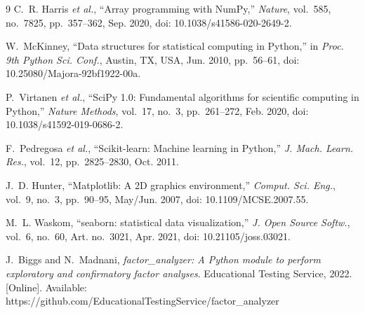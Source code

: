\documentclass[eng]{ajceam-class}
\begin{document}
\begin{thebibliography}{9}
C.~R. Harris \textit{et al.}, ``Array programming with NumPy,'' \textit{Nature}, vol.~585, no.~7825, pp.~357--362, Sep. 2020, doi: 10.1038/s41586-020-2649-2.

W.~McKinney, ``Data structures for statistical computing in Python,'' in \textit{Proc. 9th Python Sci. Conf.}, Austin, TX, USA, Jun. 2010, pp.~56--61, doi: 10.25080/Majora-92bf1922-00a.

P.~Virtanen \textit{et al.}, ``SciPy 1.0: Fundamental algorithms for scientific computing in Python,'' \textit{Nature Methods}, vol.~17, no.~3, pp.~261--272, Feb. 2020, doi: 10.1038/s41592-019-0686-2.

F.~Pedregosa \textit{et al.}, ``Scikit-learn: Machine learning in Python,'' \textit{J. Mach. Learn. Res.}, vol.~12, pp.~2825--2830, Oct. 2011.

J.~D. Hunter, ``Matplotlib: A 2D graphics environment,'' \textit{Comput. Sci. Eng.}, vol.~9, no.~3, pp.~90--95, May/Jun. 2007, doi: 10.1109/MCSE.2007.55.

M.~L. Waskom, ``seaborn: statistical data visualization,'' \textit{J. Open Source Softw.}, vol.~6, no.~60, Art. no.~3021, Apr. 2021, doi: 10.21105/joss.03021.

J.~Biggs and N.~Madnani, \textit{factor\_analyzer: A Python module to perform exploratory and confirmatory factor analyses}. Educational Testing Service, 2022. [Online]. Available: https://github.com/EducationalTestingService/factor\_analyzer

\end{thebibliography}

\end{document}

